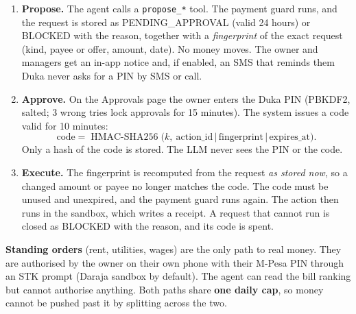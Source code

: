 \documentclass[10pt,a4paper]{article}
\newcommand{\code}[1]{\texttt{\small #1}}
\begin{document}
\begin{enumerate}
  \item \textbf{Propose.} The agent calls a \code{propose\_*} tool. The payment guard runs, and the request is stored as PENDING\_APPROVAL (valid 24 hours) or BLOCKED with the reason, together with a \emph{fingerprint} of the exact request (kind, payee or offer, amount, date). No money moves. The owner and managers get an in-app notice and, if enabled, an SMS that reminds them Duka never asks for a PIN by SMS or call.
  \item \textbf{Approve.} On the Approvals page the owner enters the Duka PIN (PBKDF2, salted; 3 wrong tries lock approvals for 15 minutes). The system issues a code valid for 10 minutes:
  \[
  \text{code}=\operatorname{HMAC\text{-}SHA256}\bigl(k,\ \text{action\_id}\,|\,\text{fingerprint}\,|\,\text{expires\_at}\bigr).
  \]
  Only a hash of the code is stored. The LLM never sees the PIN or the code.
  \item \textbf{Execute.} The fingerprint is recomputed from the request \emph{as stored now}, so a changed amount or payee no longer matches the code. The code must be unused and unexpired, and the payment guard runs again. The action then runs in the sandbox, which writes a receipt. A request that cannot run is closed as BLOCKED with the reason, and its code is spent.
\end{enumerate}

\textbf{Standing orders} (rent, utilities, wages) are the only path to real money. They are authorised by the owner on their own phone with their M-Pesa PIN through an STK prompt (Daraja sandbox by default). The agent can read the bill ranking but cannot authorise anything. Both paths share \textbf{one daily cap}, so money cannot be pushed past it by splitting across the two.
\end{document}
